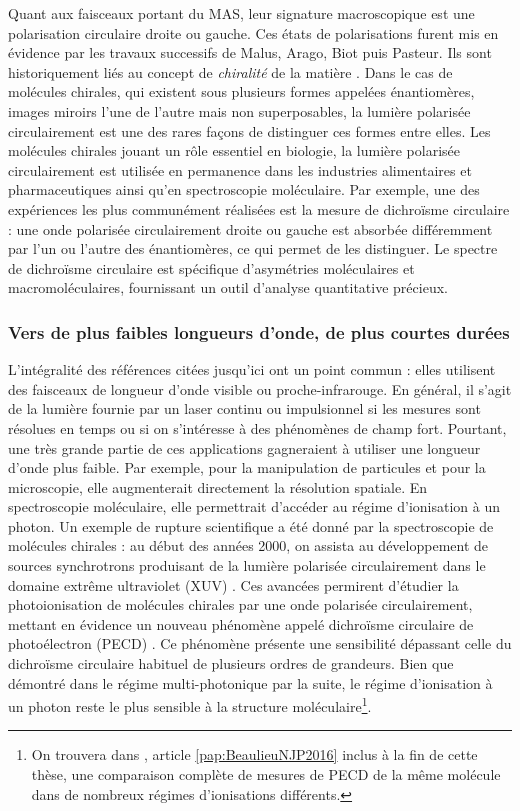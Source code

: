 Quant aux faisceaux portant du MAS, leur signature macroscopique est une polarisation circulaire droite ou gauche. Ces états de polarisations furent mis en évidence par les travaux successifs de Malus, Arago, Biot puis Pasteur. Ils sont historiquement liés au concept de \textit{chiralité} de la matière . Dans le cas de molécules chirales, qui existent sous plusieurs formes appelées énantiomères, images miroirs l'une de l'autre mais non superposables, la lumière polarisée circulairement est une des rares façons de distinguer ces formes entre elles. Les molécules chirales jouant un rôle essentiel en biologie, la lumière polarisée circulairement est utilisée en permanence dans les industries alimentaires et pharmaceutiques ainsi qu'en spectroscopie moléculaire. Par exemple, une des expériences les plus communément réalisées est la mesure de dichroïsme circulaire : une onde polarisée circulairement droite ou gauche est absorbée différemment par l'un ou l'autre des énantiomères, ce qui permet de les distinguer. Le spectre de dichroïsme circulaire est spécifique d’asymétries moléculaires et macromoléculaires, fournissant un outil d'analyse quantitative précieux.

\subsubsection{Vers de plus faibles longueurs d'onde, de plus courtes durées}
L'intégralité des références citées jusqu'ici ont un point commun : elles utilisent des faisceaux de longueur d'onde visible ou proche-infrarouge. En général, il s'agit de la lumière fournie par un laser continu ou impulsionnel si les mesures sont résolues en temps ou si on s'intéresse à des phénomènes de champ fort. Pourtant, une très grande partie de ces applications gagneraient à utiliser une longueur d'onde plus faible. Par exemple, pour la manipulation de particules et pour la microscopie, elle augmenterait directement la résolution spatiale. En spectroscopie moléculaire, elle permettrait d'accéder au régime d'ionisation à un photon. Un exemple de rupture scientifique a été donné par la spectroscopie de molécules chirales : au début des années 2000, on assista au développement de sources synchrotrons produisant de la lumière polarisée circulairement dans le domaine extrême ultraviolet (XUV) . Ces avancées permirent d'étudier la photoionisation de molécules chirales par une onde polarisée circulairement, mettant en évidence un nouveau phénomène appelé dichroïsme circulaire de photoélectron (PECD) . Ce phénomène présente une sensibilité dépassant celle du dichroïsme circulaire habituel de plusieurs ordres de grandeurs. Bien que démontré dans le régime multi-photonique par la suite, le régime d'ionisation à un photon reste le plus sensible à la structure moléculaire\footnote{On trouvera dans , article \ref{pap:BeaulieuNJP2016} inclus à la fin de cette thèse, une comparaison complète de mesures de PECD de la même molécule dans de nombreux régimes d'ionisations différents.}.

